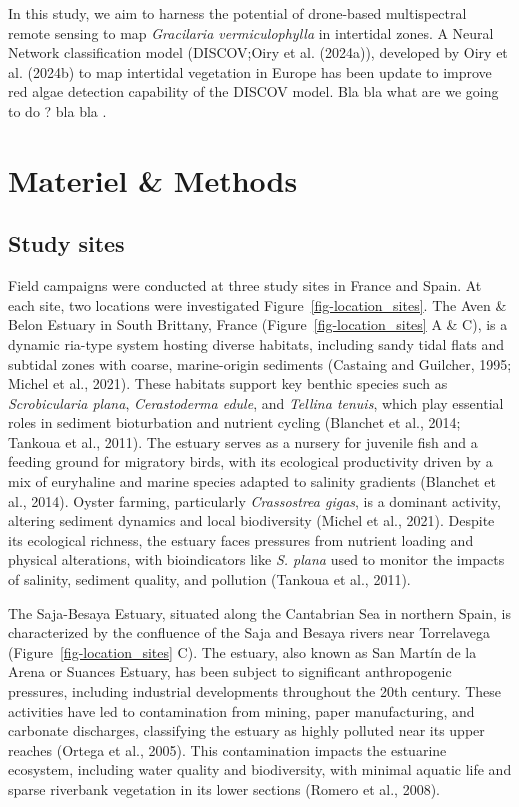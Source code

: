 \documentclass[
  letterpaper,
  DIV=11,
  numbers=noendperiod]{scrartcl}
\begin{document}
In this study, we aim to harness the potential of drone-based
multispectral remote sensing to map \emph{Gracilaria vermiculophylla} in
intertidal zones. A Neural Network classification model (DISCOV;Oiry et
al. (2024a)), developed by Oiry et al. (2024b) to map intertidal
vegetation in Europe has been update to improve red algae detection
capability of the DISCOV model. Bla bla what are we going to do ? bla
bla .

\section{Materiel \& Methods}\label{materiel-methods}

\subsection{Study sites}\label{study-sites}

Field campaigns were conducted at three study sites in France and Spain.
At each site, two locations were investigated
Figure~\ref{fig-location_sites}. The Aven \& Belon Estuary in South
Brittany, France (Figure~\ref{fig-location_sites} A \& C), is a dynamic
ria-type system hosting diverse habitats, including sandy tidal flats
and subtidal zones with coarse, marine-origin sediments (Castaing and
Guilcher, 1995; Michel et al., 2021). These habitats support key benthic
species such as \emph{Scrobicularia plana}, \emph{Cerastoderma edule},
and \emph{Tellina tenuis}, which play essential roles in sediment
bioturbation and nutrient cycling (Blanchet et al., 2014; Tankoua et
al., 2011). The estuary serves as a nursery for juvenile fish and a
feeding ground for migratory birds, with its ecological productivity
driven by a mix of euryhaline and marine species adapted to salinity
gradients (Blanchet et al., 2014). Oyster farming, particularly
\emph{Crassostrea gigas}, is a dominant activity, altering sediment
dynamics and local biodiversity (Michel et al., 2021). Despite its
ecological richness, the estuary faces pressures from nutrient loading
and physical alterations, with bioindicators like \emph{S. plana} used
to monitor the impacts of salinity, sediment quality, and pollution
(Tankoua et al., 2011).

The Saja-Besaya Estuary, situated along the Cantabrian Sea in northern
Spain, is characterized by the confluence of the Saja and Besaya rivers
near Torrelavega (Figure~\ref{fig-location_sites} C). The estuary, also
known as San Martín de la Arena or Suances Estuary, has been subject to
significant anthropogenic pressures, including industrial developments
throughout the 20th century. These activities have led to contamination
from mining, paper manufacturing, and carbonate discharges, classifying
the estuary as highly polluted near its upper reaches (Ortega et al.,
2005). This contamination impacts the estuarine ecosystem, including
water quality and biodiversity, with minimal aquatic life and sparse
riverbank vegetation in its lower sections (Romero et al., 2008).
\end{document}

